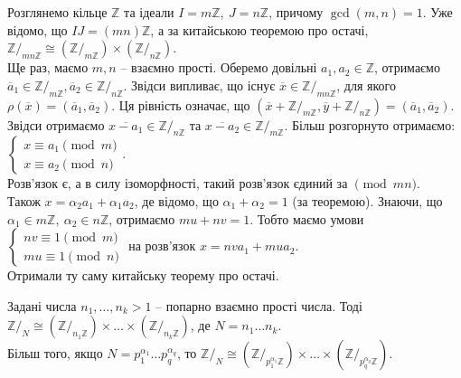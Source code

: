 \documentclass{math_library}
\begin{document}
\begin{example}
Розглянемо кільце $\mathbb{Z}$ та ідеали $I = m \mathbb{Z},\ J = n \mathbb{Z}$, причому $\gcd(m,n) = 1$. Уже відомо, що $IJ = (mn) \mathbb{Z}$, а за китайською теоремою про остачі,\\
$\mathbb{Z}/_{mn \mathbb{Z}} \cong (\mathbb{Z}/_{m \mathbb{Z}}) \times (\mathbb{Z}/_{n \mathbb{Z}})$.
\bigskip \\
Ще раз, маємо $m,n$ -- взаємно прості. Оберемо довільні $a_1,a_2 \in \mathbb{Z}$, отримаємо $\overline{a}_1 \in \mathbb{Z}/_{m \mathbb{Z}}, \overline{a}_2 \in \mathbb{Z}/_{n \mathbb{Z}}$. Звідси випливає, що існує $\overline{x} \in \mathbb{Z}/_{ mn \mathbb{Z}}$, для якого $\rho(\overline{x}) = (\overline{a}_1,\overline{a}_2)$. Ця рівність означає, що $(\overline{x} + \mathbb{Z}/_{m \mathbb{Z}}, \overline{y} + \mathbb{Z}/_{n \mathbb{Z}}) = (\overline{a}_1,\overline{a}_2)$. Звідси отримаємо $\overline{x-a_1} \in \mathbb{Z}/_{n \mathbb{Z}}$ та $\overline{x-a_2} \in \mathbb{Z}/_{m \mathbb{Z}}$. Більш розгорнуто отримаємо:\\
$\begin{cases}
x \equiv a_1 \pmod m \\
x \equiv a_2 \pmod n
\end{cases}$.\\
Розв'язок є, а в силу ізоморфності, такий розв'язок єдиний за $\pmod {mn}$.\\
Також $x = \alpha_2 a_1 + \alpha_1 a_2$, де відомо, що $\alpha_1 + \alpha_2 = 1$ (за теоремою). Знаючи, що $\alpha_1 \in m \mathbb{Z},\ \alpha_2 \in n \mathbb{Z}$, отримаємо $mu + nv = 1$. Тобто маємо умови $\begin{cases} nv \equiv 1 \pmod m \\ mu \equiv 1 \pmod n \end{cases}$ на розв'язок $x = nv a_1 + mu a_2$.\\
Отримали ту саму китайську теорему про остачі.
\end{example}

\begin{corollary}
Задані числа $n_1,\dots,n_k > 1$ -- попарно взаємно прості числа. Тоді $\mathbb{Z}/_{N} \cong (\mathbb{Z}/_{n_1 \mathbb{Z}}) \times \dots \times (\mathbb{Z}/_{n_k \mathbb{Z}})$, де $N = n_1 \dots n_k$.\\
Більш того, якщо $N = p_1^{\alpha_1} \dots p_q^{\alpha_q}$, то $\mathbb{Z}/_{N} \cong (\mathbb{Z}/_{p_1^{\alpha_1} \mathbb{Z}}) \times \dots \times (\mathbb{Z}/_{p_q^{\alpha_q} \mathbb{Z}})$.
\end{corollary}
\end{document}
